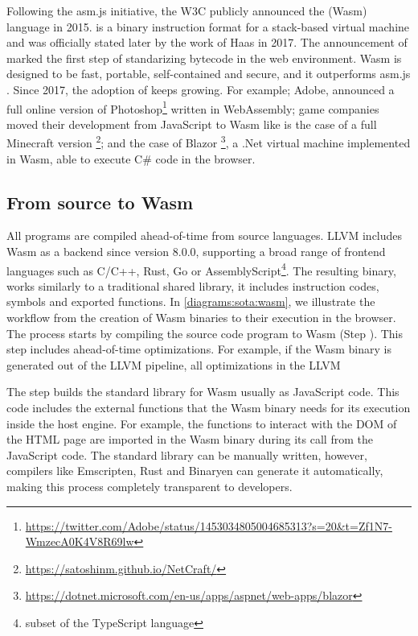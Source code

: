 Following the asm.js initiative, the W3C publicly announced the \wasm (Wasm) language in 2015. \wasm is a binary instruction format for a stack-based virtual machine and was officially stated later by the work of Haas \etal \cite{Haas_2017} in 2017. The announcement of \wasm marked the first step of standarizing bytecode in the web environment. Wasm is designed to be fast, portable, self-contained and secure, and it outperforms asm.js \cite{Haas_2017}. Since 2017, the adoption of \wasm keeps growing. For example; Adobe, announced a full online version of Photoshop\footnote{\url{https://twitter.com/Adobe/status/1453034805004685313?s=20&t=Zf1N7-WmzecA0K4V8R69lw}} written in WebAssembly;  game companies moved their development from JavaScript to Wasm like is the case of a full Minecraft version \footnote{\url{https://satoshinm.github.io/NetCraft/}}; and the case of Blazor \footnote{\url{https://dotnet.microsoft.com/en-us/apps/aspnet/web-apps/blazor}}, a .Net virtual machine implemented in Wasm, able to execute C\# code in the browser.


\subsection*{From source to Wasm}

All \wasm programs are compiled ahead-of-time from source languages. LLVM includes Wasm as a backend since version 8.0.0, supporting a broad range of frontend languages such as C/C++, Rust, Go or AssemblyScript\footnote{subset of the TypeScript language}. The resulting binary, works similarly to a traditional shared library, it includes instruction codes, symbols and exported functions. In \autoref{diagrams:sota:wasm}, we illustrate the workflow from the creation of Wasm binaries to their execution in the browser. The process starts by compiling the source code program to Wasm (Step ). This step includes ahead-of-time optimizations. For example, if the Wasm binary is generated out of the LLVM pipeline, all optimizations in the LLVM 


The step  builds the standard library for Wasm usually as JavaScript code. This code includes the external functions that the Wasm binary needs for its execution inside the host engine. For example, the functions to interact with the DOM of the HTML page are imported in the Wasm binary during its call from the JavaScript code. The standard library can be manually written, however, compilers like Emscripten, Rust and Binaryen can generate it automatically, making this process completely transparent to developers.

